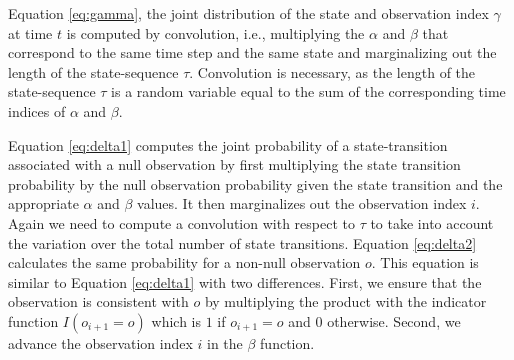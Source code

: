 \documentclass[letterpaper]{article}
\begin{document}
Equation \ref{eq:gamma}, the joint distribution of the state and observation index $\gamma$ at time $t$ is computed by convolution, i.e., multiplying the $\alpha$ and $\beta$ that correspond to the same time step and the same state and marginalizing out the length of the state-sequence $\tau$. Convolution is necessary, as the length of the state-sequence $\tau$ is a random variable equal to the sum of the corresponding time indices of $\alpha$ and $\beta$.

Equation \ref{eq:delta1} computes the joint probability of a state-transition associated with a null observation by first multiplying the state transition probability by the null observation probability given the state transition and the appropriate $\alpha$ and $\beta$ values. It then marginalizes out the observation index $i$. Again we need to compute a convolution with respect to $\tau$ to take into account the variation over the total number of state transitions.
Equation \ref{eq:delta2} calculates the same probability for a non-null observation $o$. This equation is similar to Equation \ref{eq:delta1} with two differences.  First, we ensure that the observation is consistent with $o$ by multiplying the product with the indicator function $I(o_{i+1} = o)$ which is $1$ if $o_{i+1} = o$ and $0$ otherwise.  Second, we advance the observation index $i$ in the $\beta$ function.
\end{document}
